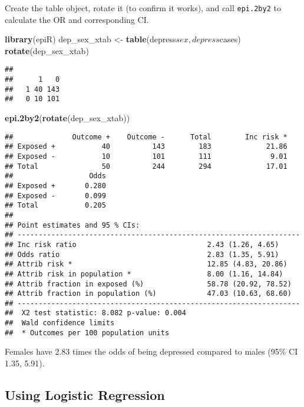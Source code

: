 \documentclass[]{article}
\newenvironment{Shaded}{\begin{snugshade}}{\end{snugshade}}
\newcommand{\KeywordTok}[1]{\textcolor[rgb]{0.13,0.29,0.53}{\textbf{{#1}}}}
\newcommand{\StringTok}[1]{\textcolor[rgb]{0.31,0.60,0.02}{{#1}}}
\newcommand{\NormalTok}[1]{{#1}}
\begin{document}
Create the table object, rotate it (to confirm it works), and call
\texttt{epi.2by2} to calculate the OR and corresponding CI.

\begin{Shaded}
\begin{Highlighting}[]
\KeywordTok{library}\NormalTok{(epiR)}
\NormalTok{dep_sex_xtab <-}\StringTok{ }\KeywordTok{table}\NormalTok{(depress$sex, depress$cases)}
\KeywordTok{rotate}\NormalTok{(dep_sex_xtab)}
\end{Highlighting}
\end{Shaded}

\begin{verbatim}
##    
##      1   0
##   1 40 143
##   0 10 101
\end{verbatim}

\begin{Shaded}
\begin{Highlighting}[]
\KeywordTok{epi.2by2}\NormalTok{(}\KeywordTok{rotate}\NormalTok{(dep_sex_xtab))}
\end{Highlighting}
\end{Shaded}

\begin{verbatim}
##              Outcome +    Outcome -      Total        Inc risk *
## Exposed +           40          143        183             21.86
## Exposed -           10          101        111              9.01
## Total               50          244        294             17.01
##                  Odds
## Exposed +       0.280
## Exposed -       0.099
## Total           0.205
## 
## Point estimates and 95 % CIs:
## -------------------------------------------------------------------
## Inc risk ratio                               2.43 (1.26, 4.65)
## Odds ratio                                   2.83 (1.35, 5.91)
## Attrib risk *                                12.85 (4.83, 20.86)
## Attrib risk in population *                  8.00 (1.16, 14.84)
## Attrib fraction in exposed (%)               58.78 (20.92, 78.52)
## Attrib fraction in population (%)            47.03 (10.63, 68.60)
## -------------------------------------------------------------------
##  X2 test statistic: 8.082 p-value: 0.004
##  Wald confidence limits
##  * Outcomes per 100 population units
\end{verbatim}

Females have 2.83 times the odds of being depressed compared to males
(95\% CI 1.35, 5.91).

\subsection{Using Logistic Regression}\label{using-logistic-regression}
\end{document}
